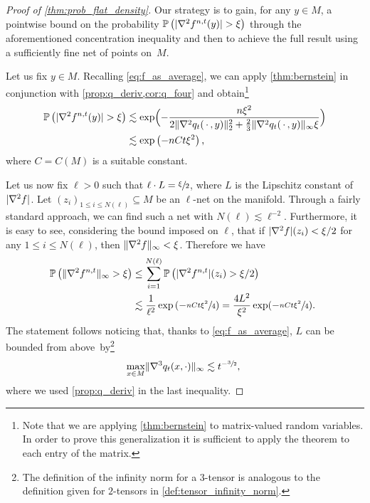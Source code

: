 \documentclass[JEP,XML,SOM,Unicode]{cedram}
\theoremstyle{plain}
\theoremstyle{definition}
\numberwithin{equation}{section}
\newcommand{\emptyparam}{\ensuremath{\,\cdot\,}}
\renewcommand{\P}[1]{\ensuremath{\operatorname{\mathbb{P}}\left(#1\right)}}
\renewcommand{\comma}{\ensuremath{\text{, }}}
\newcommand{\comma}{\ensuremath{\text{, }}}
\newcommand{\fullstop}{\ensuremath{\text{. }}}
\DeclarePairedDelimiter\abs{\lvert}{\rvert}
\DeclarePairedDelimiter\norm{\lVert}{\rVert}
\begin{document}
\begin{proof}[Proof of \cref{thm:prob_flat_density}]
Our strategy is to gain, for any $y\in M$, a pointwise bound on the probability
$\P{\abs{\nabla^2f^{n,t}(y)}>\xi}$ through the aforementioned concentration inequality and then to achieve
the full result using a sufficiently fine net of points on~$M$.

Let us fix $y\in M$. Recalling \cref{eq:f_as_average}, we can apply \cref{thm:bernstein}
in conjunction with \cref{prop:q_deriv,cor:q_four} and obtain\footnote{Note that we are applying \cref{thm:bernstein} to matrix-valued random variables. In order to prove this generalization it is sufficient to apply the theorem to each entry of the matrix.}
\begin{align*}
\P{\abs{\nabla^2 f^{n,t}(y)}>\xi}
&\lesssim \exp\Bigl(-\frac{n\xi^2}{
2\norm{\nabla^2 q_t(\emptyparam, y)}^2_2+\frac23\norm{\nabla^2 q_t(\emptyparam, y)}_\infty\xi
}\Bigr) \\
&\lesssim \exp\left(-nCt\xi^2\right)\comma
\end{align*}
where $C=C(M)$ is a suitable constant.

Let us now fix $\ell>0$ such that
$\ell\cdot L=\sfrac\xi2$, where $L$ is the Lipschitz constant of $\abs{\nabla^2 f}$.
Let $(z_i)_{1\le i\le N(\ell)}\subseteq M$ be
an $\ell$-net on the manifold.
Through a fairly standard approach, we can find such a net with $N(\ell)\lesssim \ell^{-2}$.
Furthermore, it is easy to see, considering the bound imposed on $\ell$, that if
$\abs{\nabla^2 f}(z_i)<\xi/2$ for any $1\le i\le N(\ell)$, then $\norm{\nabla^2 f}_\infty<\xi$.
Therefore we have
\begin{align*}
\P{\norm{\nabla^2 f^{n,t}}_\infty>\xi}
&\le \sum_{i=1}^{N(\ell)}\P{\abs{\nabla^2 f^{n,t}}(z_i)>\xi/2}\\
&\lesssim \frac1{\ell^2} \exp\left(-\sfrac{nCt\xi^2}4\right)
= \frac{4L^2}{\xi^2}\exp(-\sfrac{nCt\xi^2}{4})\fullstop
\end{align*}
The statement follows noticing that, thanks to \cref{eq:f_as_average}, $L$ can be bounded
from above~by\footnote{The definition of the infinity norm for a $3$-tensor
is analogous to the definition given for $2$\nobreakdash-tensors in \cref{def:tensor_infinity_norm}.}
\begin{equation*}
\max_{x\in M}\norm{\nabla^3 q_t(x,\cdot)}_\infty\lesssim t^{-\sfrac32} \comma
\end{equation*}
where we used \cref{prop:q_deriv} in the last inequality.
\end{proof}
\end{document}
